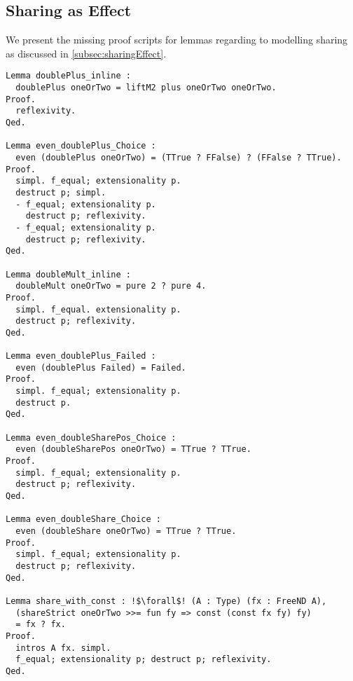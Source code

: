 \subsection*{Sharing as Effect}
\label{subsec:appendix:sharing}

We present the missing proof scripts for lemmas regarding to modelling sharing as discussed in \autoref{subsec:sharingEffect}.

\begin{verbatim}
Lemma doublePlus_inline :
  doublePlus oneOrTwo = liftM2 plus oneOrTwo oneOrTwo.
Proof.
  reflexivity.
Qed.

Lemma even_doublePlus_Choice :
  even (doublePlus oneOrTwo) = (TTrue ? FFalse) ? (FFalse ? TTrue).
Proof.
  simpl. f_equal; extensionality p.
  destruct p; simpl.
  - f_equal; extensionality p.
    destruct p; reflexivity.
  - f_equal; extensionality p.
    destruct p; reflexivity.
Qed.

Lemma doubleMult_inline :
  doubleMult oneOrTwo = pure 2 ? pure 4.
Proof.
  simpl. f_equal. extensionality p.
  destruct p; reflexivity.
Qed.

Lemma even_doublePlus_Failed :
  even (doublePlus Failed) = Failed.
Proof.
  simpl. f_equal; extensionality p.
  destruct p.
Qed.

Lemma even_doubleSharePos_Choice :
  even (doubleSharePos oneOrTwo) = TTrue ? TTrue.
Proof.
  simpl. f_equal; extensionality p.
  destruct p; reflexivity.
Qed.

Lemma even_doubleShare_Choice :
  even (doubleShare oneOrTwo) = TTrue ? TTrue.
Proof.
  simpl. f_equal; extensionality p.
  destruct p; reflexivity.
Qed.

Lemma share_with_const : !$\forall$! (A : Type) (fx : FreeND A),
  (shareStrict oneOrTwo >>= fun fy => const (const fx fy) fy)
  = fx ? fx.
Proof.
  intros A fx. simpl.
  f_equal; extensionality p; destruct p; reflexivity.
Qed.
\end{verbatim}
